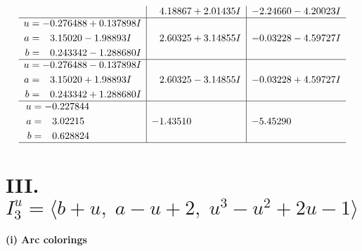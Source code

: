 \documentclass[1p]{elsarticle_modified}
\theoremstyle{definition}
\begin{document}
$$\begin{array}{c|c|c}
 & \phantom{-}4.18867 + 2.01435 I & -2.24660 - 4.20023 I \\ \hline\begin{aligned}
u &= -0.276488 + 0.137898 I \\
a &= \phantom{-}3.15020 - 1.98893 I \\
b &= \phantom{-}0.243342 - 1.288680 I\end{aligned}
 & \phantom{-}2.60325 + 3.14855 I & -0.03228 - 4.59727 I \\ \hline\begin{aligned}
u &= -0.276488 - 0.137898 I \\
a &= \phantom{-}3.15020 + 1.98893 I \\
b &= \phantom{-}0.243342 + 1.288680 I\end{aligned}
 & \phantom{-}2.60325 - 3.14855 I & -0.03228 + 4.59727 I \\ \hline\begin{aligned}
u &= -0.227844\phantom{ +0.000000I} \\
a &= \phantom{-}3.02215\phantom{ +0.000000I} \\
b &= \phantom{-}0.628824\phantom{ +0.000000I}\end{aligned}
 & -1.43510\phantom{ +0.000000I} & -5.45290\phantom{ +0.000000I}\\
 \hline 
 \end{array}$$\newpage\newpage\renewcommand{\arraystretch}{1}
\centering \section*{III. $I^u_{3}= \langle b+u,\;a- u+2,\;u^3- u^2+2 u-1 \rangle$}
\flushleft \textbf{(i) Arc colorings}\\
\end{document}
